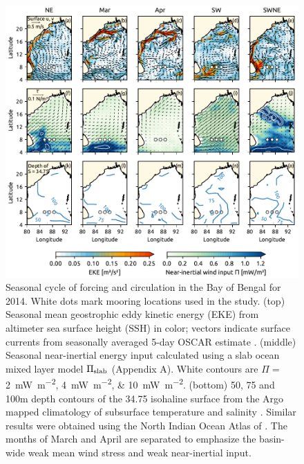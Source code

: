 \documentclass[twocol]{ametsoc}
\begin{document}
\begin{figure}
\centering
\includegraphics[width=\textwidth]{figure2-spatial-maps.pdf}
\caption{\label{fig:spatial}
Seasonal cycle of forcing and circulation in the Bay of Bengal for 2014. White dots mark mooring locations used in the study. (top) Seasonal mean geostrophic eddy kinetic energy (EKE) from altimeter sea surface height (SSH) in color; vectors indicate surface currents from seasonally averaged 5-day OSCAR estimate \citep{oscar,Bonjean2002}. (middle) Seasonal near-inertial energy input calculated using a slab ocean mixed layer model \(\Pi_\text{slab}\) (Appendix A). White contours are \(\Pi=\) \SIlist{2; 4; 10}{\milli\W\per\square\metre}. (bottom) 50, 75 and 100m depth contours of the 34.75 isohaline surface from the Argo mapped climatology of subsurface temperature and salinity \citep{Roemmich2009}. Similar results were obtained using the North Indian Ocean Atlas of \cite{Chatterjee2012}. The months of March and April are separated to emphasize the basin-wide weak mean wind stress and weak near-inertial input.}
\end{figure}
\end{document}
